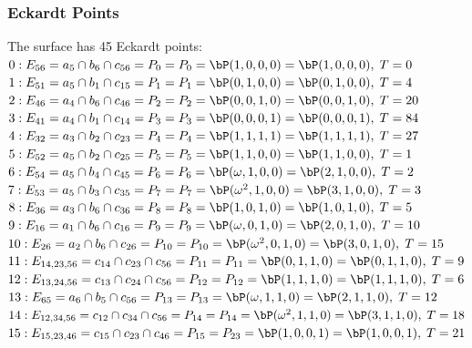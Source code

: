 \subsubsection*{Eckardt Points}
The surface has 45 Eckardt points:\\
$0 : E_{56}=a_{5} \cap b_{6} \cap c_{56} = P_{0} = P_{0}=\bP(1, 0, 0, 0) = \bP(1, 0, 0, 0),\; T= 0$\\
$1 : E_{51}=a_{5} \cap b_{1} \cap c_{15} = P_{1} = P_{1}=\bP(0, 1, 0, 0) = \bP(0, 1, 0, 0),\; T= 4$\\
$2 : E_{46}=a_{4} \cap b_{6} \cap c_{46} = P_{2} = P_{2}=\bP(0, 0, 1, 0) = \bP(0, 0, 1, 0),\; T= 20$\\
$3 : E_{41}=a_{4} \cap b_{1} \cap c_{14} = P_{3} = P_{3}=\bP(0, 0, 0, 1) = \bP(0, 0, 0, 1),\; T= 84$\\
$4 : E_{32}=a_{3} \cap b_{2} \cap c_{23} = P_{4} = P_{4}=\bP(1, 1, 1, 1) = \bP(1, 1, 1, 1),\; T= 27$\\
$5 : E_{52}=a_{5} \cap b_{2} \cap c_{25} = P_{5} = P_{5}=\bP(1, 1, 0, 0) = \bP(1, 1, 0, 0),\; T= 1$\\
$6 : E_{54}=a_{5} \cap b_{4} \cap c_{45} = P_{6} = P_{6}=\bP(\omega , 1, 0, 0) = \bP(2, 1, 0, 0),\; T= 2$\\
$7 : E_{53}=a_{5} \cap b_{3} \cap c_{35} = P_{7} = P_{7}=\bP(\omega^{2}, 1, 0, 0) = \bP(3, 1, 0, 0),\; T= 3$\\
$8 : E_{36}=a_{3} \cap b_{6} \cap c_{36} = P_{8} = P_{8}=\bP(1, 0, 1, 0) = \bP(1, 0, 1, 0),\; T= 5$\\
$9 : E_{16}=a_{1} \cap b_{6} \cap c_{16} = P_{9} = P_{9}=\bP(\omega , 0, 1, 0) = \bP(2, 0, 1, 0),\; T= 10$\\
$10 : E_{26}=a_{2} \cap b_{6} \cap c_{26} = P_{10} = P_{10}=\bP(\omega^{2}, 0, 1, 0) = \bP(3, 0, 1, 0),\; T= 15$\\
$11 : E_{14,23,56}=c_{14} \cap c_{23} \cap c_{56} = P_{11} = P_{11}=\bP(0, 1, 1, 0) = \bP(0, 1, 1, 0),\; T= 9$\\
$12 : E_{13,24,56}=c_{13} \cap c_{24} \cap c_{56} = P_{12} = P_{12}=\bP(1, 1, 1, 0) = \bP(1, 1, 1, 0),\; T= 6$\\
$13 : E_{65}=a_{6} \cap b_{5} \cap c_{56} = P_{13} = P_{13}=\bP(\omega , 1, 1, 0) = \bP(2, 1, 1, 0),\; T= 12$\\
$14 : E_{12,34,56}=c_{12} \cap c_{34} \cap c_{56} = P_{14} = P_{14}=\bP(\omega^{2}, 1, 1, 0) = \bP(3, 1, 1, 0),\; T= 18$\\
$15 : E_{15,23,46}=c_{15} \cap c_{23} \cap c_{46} = P_{15} = P_{23}=\bP(1, 0, 0, 1) = \bP(1, 0, 0, 1),\; T= 21$\\
